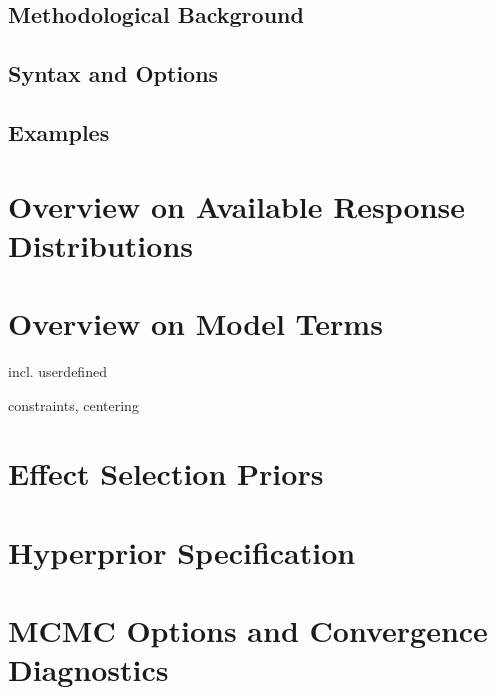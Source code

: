 \subsection{Methodological Background}

\subsection{Syntax and Options}

\subsection{Examples}

\section{Overview on Available Response Distributions}
\label{mcmcreg_distributions}

\section{Overview on Model Terms}
\label{mcmcreg_modelterms}

incl. userdefined

constraints, centering

\section{Effect Selection Priors}

\section{Hyperprior Specification}

\section{MCMC Options and Convergence Diagnostics}


